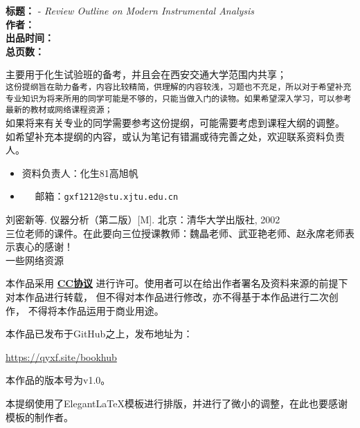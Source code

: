 \newpage
\hypersetup{pageanchor=true}

\begin{tcolorbox}[title={\bfseries 作品信息}]
	\makeatletter
	 \textbf{标题：}\@title{} - \textit{Review Outline on Modern Instrumental Analysis}\\
	 \textbf{作者：}\@author\\
	 \textbf{出品时间：}\@date\\
	 \textbf{总页数：}\pageref{LastPage}
	\makeatother
\end{tcolorbox}

\begin{tcolorbox}[title={\bfseries 关于本提纲用途的说明}]
 主要用于化生试验班的备考，并且会在西安交通大学范围内共享；\\
 \texttt{这份提纲旨在助力备考，内容比较精简，供理解的内容较浅，习题也不充足，所以对于希望补充专业知识为将来所用的同学可能是不够的，只能当做入门的读物。如果希望深入学习，可以参考最新的教材或网络课程资源；}\\
 如果将来有关专业的同学需要参考这份提纲，可能需要考虑到课程大纲的调整。
 如希望补充本提纲的内容，或认为笔记有错漏或待完善之处，欢迎联系资料负责人。
\begin{itemize}
	\item 资料负责人：化生81\hspace{1em}高旭帆
	\item \faEnvelopeOpen ~~ 邮箱：\texttt{gxf1212@stu.xjtu.edu.cn}
\end{itemize}
\end{tcolorbox}

\begin{tcolorbox}[title={\bfseries 主要参考资料}]
 刘密新等. 仪器分析（第二版）[M]. 北京：清华大学出版社, 2002\\
 三位老师的课件。在此要向三位授课教师：魏晶老师、武亚艳老师、赵永席老师表示衷心的感谢！\\
 一些网络资源
\end{tcolorbox}


\begin{tcolorbox}[title={\bfseries 许可证说明}]
\centerline{}
本作品采用 \href{https://creativecommons.org/licenses/by-nc-nd/4.0/}{\textbf{CC协议}}
进行许可。使用者可以在给出作者署名及资料来源的前提下对本作品进行转载，
但不得对本作品进行修改，亦不得基于本作品进行二次创作，
不得将本作品运用于商业用途。
\end{tcolorbox}

\begin{tcolorbox}
	本作品已发布于GitHub之上，发布地址为：\\
	\centerline{\url{https://qyxf.site/bookhub}}
	本作品的版本号为\textsf{v1.0}。
	
	本提纲使用了Elegant\LaTeX 模板进行排版，并进行了微小的调整，在此也要感谢模板的制作者。
\end{tcolorbox}



